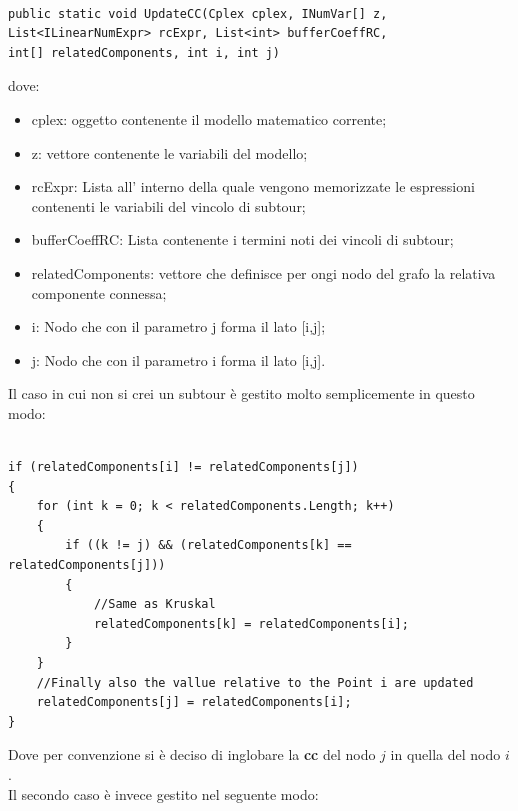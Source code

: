 \documentclass[11pt]{article}
\begin{document}
\begin{lstlisting}

public static void UpdateCC(Cplex cplex, INumVar[] z, List<ILinearNumExpr> rcExpr, List<int> bufferCoeffRC,                int[] relatedComponents, int i, int j)

\end{lstlisting}

dove:
\begin{itemize}
\item cplex: oggetto contenente il modello matematico corrente;
\item z: vettore contenente le variabili del modello;
\item rcExpr: Lista all' interno della quale vengono memorizzate le espressioni contenenti le variabili del vincolo di subtour;
\item bufferCoeffRC: Lista contenente i termini noti dei vincoli di subtour;
\item relatedComponents: vettore che definisce per ongi nodo del grafo la relativa componente connessa;
\item i: Nodo che con il parametro j forma il lato [i,j];
\item j: Nodo che con il parametro i forma il lato [i,j].
\end{itemize}

Il caso in cui non si crei un subtour è gestito molto semplicemente in questo modo:

\begin{lstlisting}

if (relatedComponents[i] != relatedComponents[j])
{
    for (int k = 0; k < relatedComponents.Length; k++)
    {
        if ((k != j) && (relatedComponents[k] == relatedComponents[j]))
        {
            //Same as Kruskal
            relatedComponents[k] = relatedComponents[i];
        }
    }
    //Finally also the vallue relative to the Point i are updated
    relatedComponents[j] = relatedComponents[i];
}

\end{lstlisting}

Dove per convenzione si è deciso di inglobare la \textbf{cc} del nodo $j$ in quella del nodo $i$.\\
Il secondo caso è invece gestito nel seguente modo:
\end{document}
